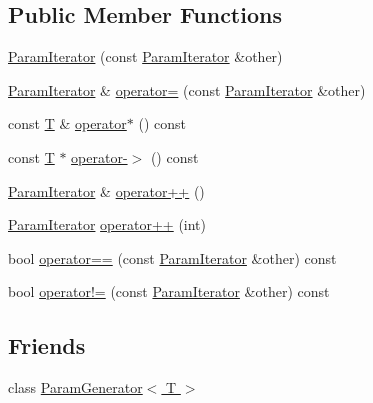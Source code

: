 \subsection*{Public Member Functions}
\begin{DoxyCompactItemize}
\item 
\hyperlink{classtesting_1_1internal_1_1ParamIterator_aa10585055ee055e304703a3004f24f33}{Param\-Iterator} (const \hyperlink{classtesting_1_1internal_1_1ParamIterator}{Param\-Iterator} \&other)
\item 
\hyperlink{classtesting_1_1internal_1_1ParamIterator}{Param\-Iterator} \& \hyperlink{classtesting_1_1internal_1_1ParamIterator_a8019f54ea1c66ca39ffdec47acfabfe6}{operator=} (const \hyperlink{classtesting_1_1internal_1_1ParamIterator}{Param\-Iterator} \&other)
\item 
const \hyperlink{calib3d_8hpp_a3efb9551a871ddd0463079a808916717}{T} \& \hyperlink{classtesting_1_1internal_1_1ParamIterator_ac06372831efcdaeadccd2fb2786f5a95}{operator$\ast$} () const 
\item 
const \hyperlink{calib3d_8hpp_a3efb9551a871ddd0463079a808916717}{T} $\ast$ \hyperlink{classtesting_1_1internal_1_1ParamIterator_aaf248ff7a1b5bb82d6ebb96c669aa75c}{operator-\/$>$} () const 
\item 
\hyperlink{classtesting_1_1internal_1_1ParamIterator}{Param\-Iterator} \& \hyperlink{classtesting_1_1internal_1_1ParamIterator_ab0922f2f554fb3beaf13c442da605e8d}{operator++} ()
\item 
\hyperlink{classtesting_1_1internal_1_1ParamIterator}{Param\-Iterator} \hyperlink{classtesting_1_1internal_1_1ParamIterator_af51e17827dd54977165937550c0fb030}{operator++} (int)
\item 
bool \hyperlink{classtesting_1_1internal_1_1ParamIterator_a1a3a858e3d2d101fe561a88affcad0d5}{operator==} (const \hyperlink{classtesting_1_1internal_1_1ParamIterator}{Param\-Iterator} \&other) const 
\item 
bool \hyperlink{classtesting_1_1internal_1_1ParamIterator_a930d5da5e7cef080b4992b48f9e79239}{operator!=} (const \hyperlink{classtesting_1_1internal_1_1ParamIterator}{Param\-Iterator} \&other) const 
\end{DoxyCompactItemize}
\subsection*{Friends}
\begin{DoxyCompactItemize}
\item 
class \hyperlink{classtesting_1_1internal_1_1ParamIterator_ab73a355ae191f2f7eab54b65ca557714}{Param\-Generator$<$ T $>$}
\end{DoxyCompactItemize}


